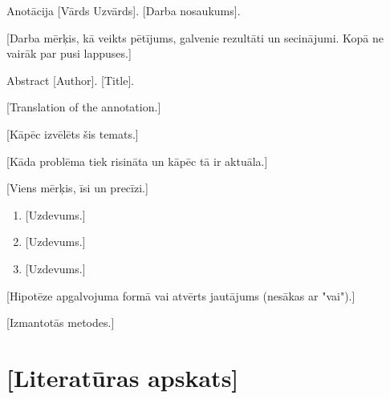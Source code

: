 \documentclass{zpd}
\begin{document}
\titullapa

\anotacijulapa
\begin{anotacija}{Anotācija}
[Vārds Uzvārds]. [Darba nosaukums].

[Darba mērķis, kā veikts pētījums, galvenie rezultāti un secinājumi. Kopā ne vairāk par pusi lappuses.]

\end{anotacija}

\begin{anotacija}{Abstract}
[Author]. [Title].

[Translation of the annotation.]

\end{anotacija}

\saturs

\pamatteksts
{}
[Kāpēc izvēlēts šis temats.]

[Kāda problēma tiek risināta un kāpēc tā ir aktuāla.]

[Viens mērķis, īsi un precīzi.]

\begin{enumerate}
  \item {}[Uzdevums.]
  \item {}[Uzdevums.]
  \item {}[Uzdevums.]
\end{enumerate}

[Hipotēze apgalvojuma formā vai atvērts jautājums (nesākas ar "vai").]

[Izmantotās metodes.]

\section{[Literatūras apskats]}
\end{document}
